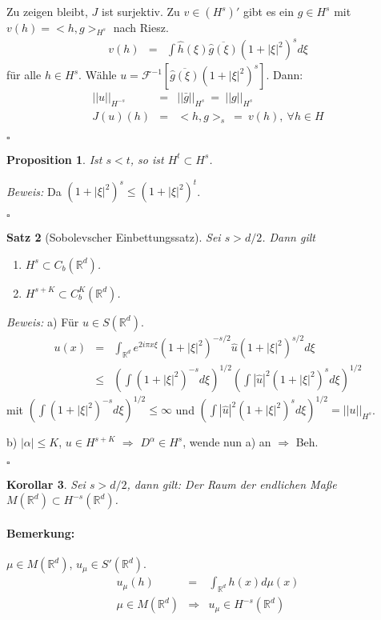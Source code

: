 \documentclass[12pt,a4paper,titlepage]{scrartcl}
\newtheorem{Satz}{Satz}[subsection]
\newtheorem{Prop}[Satz]{Proposition}
\newtheorem{Korollar}[Satz]{Korollar}
\numberwithin{equation}{section}
\newcommand{\R}{\mathbb{R}} %
\newcommand{\g}{\hat{g}}
\newcommand{\F}{\mathcal{F}}
\newcommand{\Bew}{\emph{Beweis: }}
\newcommand{\qed}{\begin{flushright}
		$\square$
	\end{flushright}}
\begin{document}
	Zu zeigen bleibt, $J$ ist surjektiv. Zu $v\in(H^s)'$ gibt es ein $g\in H^s$ mit $v(h) = <h,g>_{H^s}$ nach Riesz.
	\begin{eqnarray}
		v(h) &=& \int \hat h(\xi)\overline{\g(\xi)} (1+|\xi|^2)^s d\xi\nonumber
	\end{eqnarray}
	für alle $h\in H^s$. Wähle $u=\F^{-1}[\overline{\g(\xi)}(1+|\xi|^2)^{s}]$. Dann:
	\begin{eqnarray}
		||u||_{H^{-s}} &=& ||\bar g||_{H^s} ~=~ ||g||_{H^s}\nonumber\\
		J(u)(h) &=& <h,g>_{s}~=~ v(h),~\forall h\in H\nonumber
	\end{eqnarray}
	\qed
	
	\begin{Prop}
		Ist $s<t$, so ist $H^t\subset H^s$.
	\end{Prop}
	
	\Bew Da $(1+|\xi|^2)^s\leq (1+|\xi|^2)^t$.
	\qed
	
	\begin{Satz}[Sobolevscher Einbettungssatz]
		Sei $s>d/2$. Dann gilt
		\begin{enumerate}
			\item[a)] $H^s\subset C_b(\R^d)$.
			\item[b)] $H^{s+K}\subset C_b^K(\R^d)$.
		\end{enumerate}
	\end{Satz}
	
	\Bew a) Für $u\in S(\R^d)$. 
	\begin{eqnarray}
		u(x) &=& \int_{\R^d} e^{2i\pi x\xi}(1+|\xi|^2)^{-s/2} \hat u(1+|\xi|^2)^{s/2} d\xi\nonumber\\
		&\leq& \left(\int (1+|\xi|^2)^{-s}d\xi \right)^{1/2} \left(\int |\hat u|^2 (1+|\xi|^2)^sd\xi \right)^{1/2}\nonumber 
	\end{eqnarray}
	mit $\left(\int (1+|\xi|^2)^{-s}d\xi \right)^{1/2}\leq \infty$ und $\left(\int |\hat u|^2 (1+|\xi|^2)^sd\xi \right)^{1/2} = ||u||_{H^s}$. 
	
	b) $|\alpha|\leq K$, $u\in H^{s+K}$ $\Rightarrow$ $D^\alpha\in H^s$, wende nun a) an $\Rightarrow$ Beh.
	\qed
	
	\begin{Korollar}
		Sei $s>d/2$, dann gilt: Der Raum der endlichen Maße $M(\R^d)\subset H^{-s}(\R^d)$.
	\end{Korollar}
	
	\paragraph{Bemerkung:} $\mu\in M(\R^d)$, $u_\mu\in S'(\R^d)$.
	\begin{eqnarray}
		u_\mu(h) &=& \int_{\R^d}h(x)d\mu(x)\nonumber\\
		\mu\in M(\R^d) &\Rightarrow& u_\mu \in H^{-s}(\R^d)\nonumber
	\end{eqnarray}
	
\end{document}
